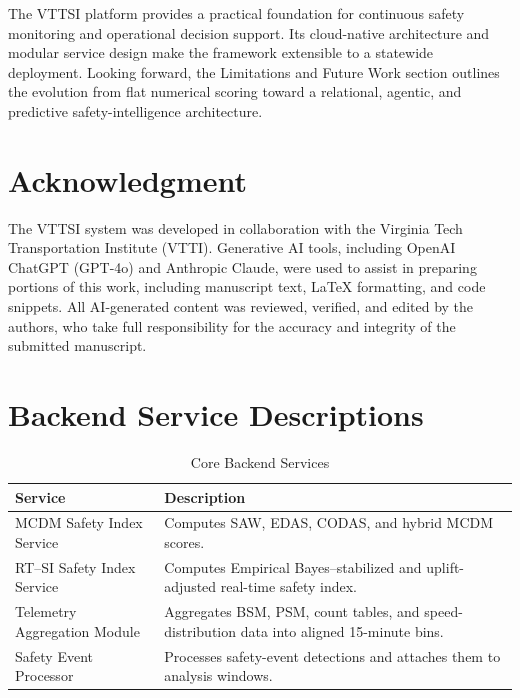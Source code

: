 \documentclass[conference]{IEEEtran}
\begin{document}
The VTTSI platform provides a practical foundation for continuous safety monitoring and
operational decision support. Its cloud-native architecture and modular service design
make the framework extensible to a statewide deployment. Looking forward, the
Limitations and Future Work section outlines the evolution from flat numerical scoring
toward a relational, agentic, and predictive safety-intelligence architecture.

\section*{Acknowledgment}
The VTTSI system was developed in collaboration with the Virginia Tech
Transportation Institute (VTTI). Generative AI tools, including OpenAI ChatGPT
(GPT-4o) and Anthropic Claude, were used to assist in preparing portions of this
work, including manuscript text, \LaTeX{} formatting, and code snippets. All
AI-generated content was reviewed, verified, and edited by the authors, who take
full responsibility for the accuracy and integrity of the submitted manuscript.

\printbibliography

\vspace{0.5em}

\clearpage
\appendices

\section{Backend Service Descriptions}
\label{appendix:backend-services}

\begin{table}[h]
\centering
\small
\caption{Core Backend Services}
\label{tbl:backend-services}
\begin{tabular}{@{}p{} p{}@{}}
\toprule
\textbf{Service} & \textbf{Description} \\
\midrule
MCDM Safety Index Service
& Computes SAW, EDAS, CODAS, and hybrid MCDM scores. \\

RT--SI Safety Index Service
& Computes Empirical Bayes–stabilized and uplift-adjusted real-time safety index. \\

Telemetry Aggregation Module
& Aggregates BSM, PSM, count tables, and speed-distribution data into aligned 15-minute bins. \\

Safety Event Processor
& Processes safety-event detections and attaches them to analysis windows. \\
\bottomrule
\end{tabular}
\end{table}
\end{document}
